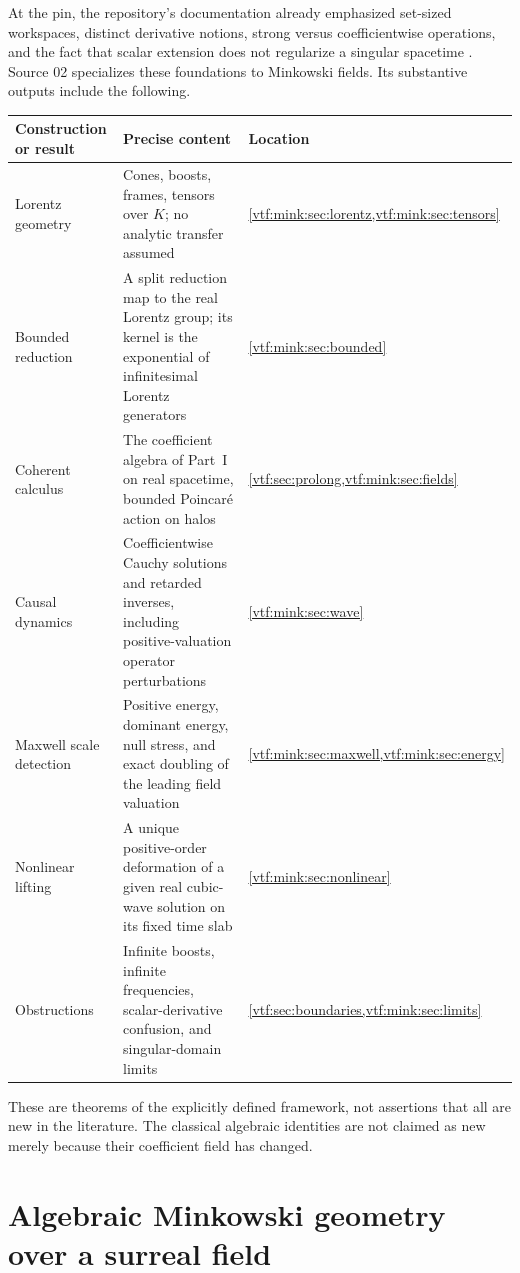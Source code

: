 \documentclass[11pt,letterpaper]{article}
\theoremstyle{definition}
\theoremstyle{remark}
\begin{document}
At the pin, the repository's documentation already emphasized set-sized workspaces, distinct derivative notions, strong versus coefficientwise operations, and the fact that scalar extension does not regularize a singular spacetime \cite{Repo,RepoPhysics}. Source 02 specializes these foundations to Minkowski fields. Its substantive
outputs include the following.

\begin{center}\small
\begin{tabularx}{\textwidth}{@{}P{0.22\textwidth}>{\raggedright\arraybackslash}XP{0.2\textwidth}@{}}
\toprule
Construction or result & Precise content & Location\\
\midrule
Lorentz geometry & Cones, boosts, frames, tensors over $K$; no analytic transfer assumed & \cref{vtf:mink:sec:lorentz,vtf:mink:sec:tensors}\\
Bounded reduction & A split reduction map to the real Lorentz group; its kernel is the exponential of infinitesimal Lorentz generators & \cref{vtf:mink:sec:bounded}\\
Coherent calculus & The coefficient algebra of Part~I on real spacetime, bounded Poincar\'e action on halos & \cref{vtf:sec:prolong,vtf:mink:sec:fields}\\
Causal dynamics & Coefficientwise Cauchy solutions and retarded inverses, including positive-valuation operator perturbations & \cref{vtf:mink:sec:wave}\\
Maxwell scale detection & Positive energy, dominant energy, null stress, and exact doubling of the leading field valuation & \cref{vtf:mink:sec:maxwell,vtf:mink:sec:energy}\\
Nonlinear lifting & A unique positive-order deformation of a given real cubic-wave solution on its fixed time slab & \cref{vtf:mink:sec:nonlinear}\\
Obstructions & Infinite boosts, infinite frequencies, scalar-derivative confusion, and singular-domain limits & \cref{vtf:sec:boundaries,vtf:mink:sec:limits}\\
\bottomrule
\end{tabularx}
\end{center}
These are theorems of the explicitly defined framework, not assertions that all are new in the literature. The classical algebraic identities are not claimed as new merely because their coefficient field has changed.

\section{Algebraic Minkowski geometry over a surreal field}\label{vtf:mink:sec:lorentz}
\end{document}
